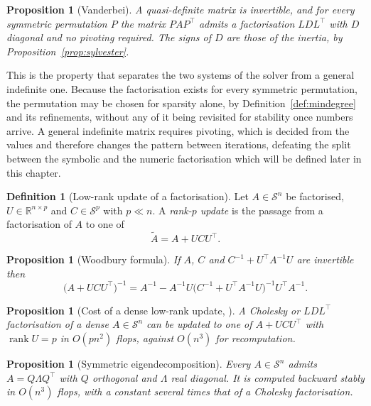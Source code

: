 \documentclass[a4paper,11pt]{book}
\theoremstyle{plain}
\newtheorem{proposition}[theorem]{Proposition}
\theoremstyle{definition}
\newtheorem{definition}[theorem]{Definition}
\theoremstyle{remark}
\numberwithin{equation}{chapter}
\numberwithin{algorithm}{chapter}
\newcommand{\R}{\mathbb{R}}
\newcommand{\Sp}{\mathcal{S}}
\newcommand{\rank}{\operatorname{rank}}
\begin{document}
	\begin{proposition}[Vanderbei]\label{prop:quasidef}
		A quasi-definite matrix is invertible, and for \emph{every} symmetric
		permutation $P$ the matrix $PAP^{\top}$ admits a factorisation
		$LDL^{\top}$ with $D$ diagonal and no pivoting required. The signs of $D$
		are those of the inertia, by Proposition~\ref{prop:sylvester}.
	\end{proposition}

	This is the property that separates the two systems of the solver from a
	general indefinite one. Because the factorisation exists for every symmetric
	permutation, the permutation may be chosen for sparsity alone, by
	Definition~\ref{def:mindegree} and its refinements, without any of it being
	revisited for stability once numbers arrive. A general indefinite matrix
	requires pivoting, which is decided from the values and therefore changes the
	pattern between iterations, defeating the split between the symbolic and the
	numeric factorisation which will be defined later in this chapter.

	\begin{definition}[Low-rank update of a factorisation]
		Let $A\in\Sp^n$ be factorised, $U\in\R^{n\times p}$ and $C\in\Sp^p$ with
		$p\ll n$. A \emph{rank-$p$ update} is the passage from a factorisation of $A$
		to one of
		\begin{equation}
			\tilde A=A+UCU^\top .
		\end{equation}
	\end{definition}
	
	\begin{proposition}[Woodbury formula]
		If $A$, $C$ and $C^{-1}+U^\top A^{-1}U$ are invertible then
		\begin{equation}
			\bigl(A+UCU^\top\bigr)^{-1}
			=A^{-1}-A^{-1}U\bigl(C^{-1}+U^\top A^{-1}U\bigr)^{-1}U^\top A^{-1} .
		\end{equation}
	\end{proposition}
	\begin{proposition}[Cost of a dense low-rank update, \cite{GillGolubMurraySaunders1974}]
		A Cholesky or $LDL^\top$ factorisation of a dense $A\in\Sp^n$ can be updated to
		one of $A+UCU^\top$ with $\rank U=p$ in $O(pn^2)$ flops, against $O(n^3)$ for
		recomputation.
	\end{proposition}
	
	\begin{proposition}[Symmetric eigendecomposition]
		Every $A\in\Sp^n$ admits $A=Q\Lambda Q^\top$ with $Q$ orthogonal and $\Lambda$
		real diagonal. It is computed backward stably in $O(n^3)$ flops, with a
		constant several times that of a Cholesky factorisation.
	\end{proposition}
	
\end{document}

